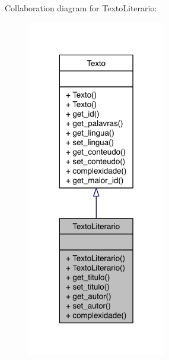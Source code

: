 Collaboration diagram for Texto\-Literario\-:
\nopagebreak
\begin{figure}[H]
\begin{center}
\leavevmode
\includegraphics[width=172pt]{class_texto_literario__coll__graph}
\end{center}
\end{figure}
